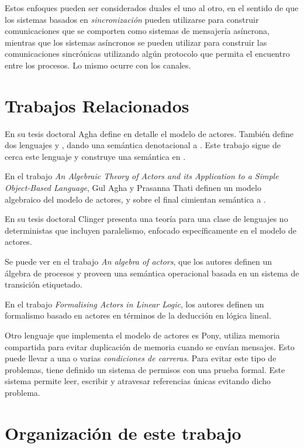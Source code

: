 Estos enfoques pueden ser considerados duales el uno al otro, en el sentido de que los sistemas basados en \emph{sincronización} pueden utilizarse para construir comunicaciones que se comporten como sistemas de mensajería asíncrona, mientras que los sistemas asíncronos se pueden utilizar para construir las comunicaciones sincrónicas utilizando algún protocolo que permita el encuentro entre los procesos. Lo mismo ocurre con los canales.

\section{Trabajos Relacionados}

En su tesis doctoral Agha\cite{Agha:1986:AMC:7929} define en detalle el modelo de actores. También define dos lenguajes \SAL y \ACT, dando una semántica denotacional a \SAL. Este trabajo sigue de cerca este lenguaje y construye una semántica en \CSP.

En el trabajo \textit{An Algebraic Theory of Actors and its Application to a Simple Object-Based Language}\cite{apicalculus}, Gul Agha y Prasanna Thati definen un modelo algebraico del modelo de actores, y sobre el final cimientan semántica a \SAL.

En su tesis doctoral Clinger\cite{Clinger:1981} presenta una teoría para una clase de lenguajes no deterministas que incluyen paralelismo, enfocado específicamente en el modelo de actores.

Se puede ver en el trabajo \textit{An algebra of actors}\cite{algebraActors}, que los autores definen un álgebra de procesos y proveen una semántica operacional basada en un sistema de transición etiquetado.

En el trabajo \textit{Formalising Actors in Linear Logic}\cite{actorLiniarLogic}, los autores definen un formalismo basado en actores en términos de la deducción en lógica lineal.

Otro lenguaje que implementa el modelo de actores es Pony\cite{ponylang}, utiliza memoria compartida para evitar duplicación de memoria cuando se envían mensajes. Esto puede llevar a una o varias \textit{condiciones de carreras}. Para evitar este tipo de problemas, tiene definido un sistema de permisos con una prueba formal\cite{Clebsch:2015:DCS:2824815.2824816}. Este sistema permite leer, escribir y atravesar referencias únicas evitando dicho problema.

\section{Organización de este trabajo}

